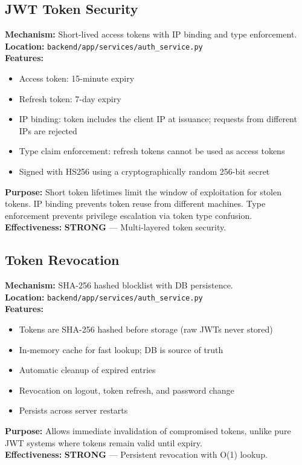 \documentclass[11pt,a4paper]{article}
\begin{document}
\subsection{JWT Token Security}

\begin{tcolorbox}[colback=shieldgreen!5, colframe=shieldgreen]
\textbf{Mechanism:} Short-lived access tokens with IP binding and type enforcement.\\
\textbf{Location:} \texttt{backend/app/services/auth\_service.py}\\
\textbf{Features:}
\begin{itemize}[nosep]
  \item Access token: 15-minute expiry
  \item Refresh token: 7-day expiry
  \item IP binding: token includes the client IP at issuance; requests from different IPs are rejected
  \item Type claim enforcement: refresh tokens cannot be used as access tokens
  \item Signed with HS256 using a cryptographically random 256-bit secret
\end{itemize}
\textbf{Purpose:} Short token lifetimes limit the window of exploitation for stolen tokens. IP binding prevents token reuse from different machines. Type enforcement prevents privilege escalation via token type confusion.\\
\textbf{Effectiveness:} \textcolor{shieldgreen}{\textbf{STRONG}} — Multi-layered token security.
\end{tcolorbox}

\subsection{Token Revocation}

\begin{tcolorbox}[colback=shieldgreen!5, colframe=shieldgreen]
\textbf{Mechanism:} SHA-256 hashed blocklist with DB persistence.\\
\textbf{Location:} \texttt{backend/app/services/auth\_service.py}\\
\textbf{Features:}
\begin{itemize}[nosep]
  \item Tokens are SHA-256 hashed before storage (raw JWTs never stored)
  \item In-memory cache for fast lookup; DB is source of truth
  \item Automatic cleanup of expired entries
  \item Revocation on logout, token refresh, and password change
  \item Persists across server restarts
\end{itemize}
\textbf{Purpose:} Allows immediate invalidation of compromised tokens, unlike pure JWT systems where tokens remain valid until expiry.\\
\textbf{Effectiveness:} \textcolor{shieldgreen}{\textbf{STRONG}} — Persistent revocation with O(1) lookup.
\end{tcolorbox}
\end{document}
